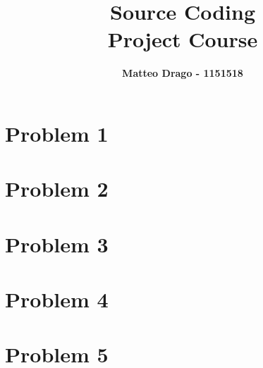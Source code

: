 \documentclass{article}
\newcommand{\hmwkTitle}{Project Course} %
\newcommand{\hmwkClass}{Source Coding} %
\newcommand{\hmwkAuthorName}{Matteo Drago - 1151518} %
\begin{document}
\title{
\vspace{2in}
\textmd{\textbf{\hmwkClass \\ \hmwkTitle}}\\
\vspace{3in}
}
\author{\textbf{\hmwkAuthorName}}
\date{} %



\maketitle
{} %


\clearpage
{} %
\setcounter{page}{1}

\section{Problem 1}

\section{Problem 2}

\section{Problem 3}

\section{Problem 4}

\section{Problem 5}
\end{document}
